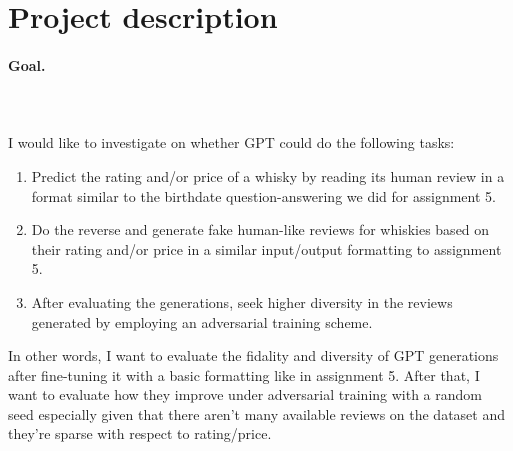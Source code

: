 \documentclass{article}
\begin{document}
\section{Project description}

\paragraph{Goal.} $ $
\\\\I would like to investigate on whether GPT could do the following tasks:
\begin{enumerate}
\item Predict the rating and/or price of a whisky by reading its human review in a format similar to the birthdate question-answering we did for assignment 5.
\item Do the reverse and generate fake human-like reviews for whiskies based on their rating and/or price in a similar input/output formatting to assignment 5.
\item After evaluating the generations, seek higher diversity in the reviews generated by employing an adversarial training scheme. 
\end{enumerate}
In other words, I want to evaluate the fidality and diversity of GPT generations after fine-tuning it with a basic formatting like in assignment 5. After that, I want to evaluate how they improve under adversarial training with a random seed especially given that there aren't many available reviews on the dataset and they're sparse with respect to rating/price.
\end{document}
